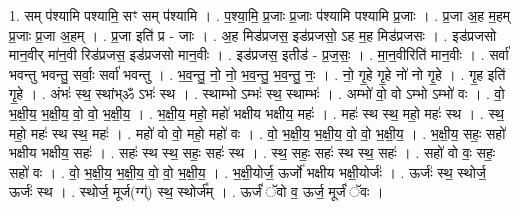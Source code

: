 \documentclass[17pt]{extarticle}
\begin{document}
1. सम् प॑श्यामि पश्यामि॒ सꣳ सम् प॑श्यामि । . प॒श्या॒मि॒ प्र॒जाः प्र॒जाः प॑श्यामि पश्यामि प्र॒जाः । . प्र॒जा अ॒ह म॒हम् प्र॒जाः प्र॒जा अ॒हम् । . प्र॒जा इति॑ प्र - जाः । . अ॒ह मिड॑प्रजस॒ इड॑प्रजसो॒ ऽह म॒ह मिड॑प्रजसः । . इड॑प्रजसो मान॒वीर् मा॑न॒वी रिड॑प्रजस॒ इड॑प्रजसो मान॒वीः । . इड॑प्रजस॒ इतीड॑ - प्र॒ज॒सः॒ । . मा॒न॒वीरिति॑ मान॒वीः । . सर्वा॑ भवन्तु भवन्तु॒ सर्वाः॒ सर्वा॑ भवन्तु । . भ॒व॒न्तु॒ नो॒ नो॒ भ॒व॒न्तु॒ भ॒व॒न्तु॒ नः॒ । . नो॒ गृ॒हे गृ॒हे नो॑ नो गृ॒हे । . गृ॒ह इति॑ गृ॒हे । . अंभः॑ स्थ॒ स्थांभ्ॐ ऽभः॑ स्थ । . स्थाम्भो ऽम्भः॑ स्थ॒ स्थाम्भः॑ । . अम्भो॑ वो॒ वो ऽम्भो ऽम्भो॑ वः । . वो॒ भ॒क्षी॒य॒ भ॒क्षी॒य॒ वो॒ वो॒ भ॒क्षी॒य॒ । . भ॒क्षी॒य॒ महो॒ महो॑ भक्षीय भक्षीय॒ महः॑ । . महः॑ स्थ स्थ॒ महो॒ महः॑ स्थ । . स्थ॒ महो॒ महः॑ स्थ स्थ॒ महः॑ । . महो॑ वो वो॒ महो॒ महो॑ वः । . वो॒ भ॒क्षी॒य॒ भ॒क्षी॒य॒ वो॒ वो॒ भ॒क्षी॒य॒ । . भ॒क्षी॒य॒ सहः॒ सहो॑ भक्षीय भक्षीय॒ सहः॑ । . सहः॑ स्थ स्थ॒ सहः॒ सहः॑ स्थ । . स्थ॒ सहः॒ सहः॑ स्थ स्थ॒ सहः॑ । . सहो॑ वो वः॒ सहः॒ सहो॑ वः । . वो॒ भ॒क्षी॒य॒ भ॒क्षी॒य॒ वो॒ वो॒ भ॒क्षी॒य॒ । . भ॒क्षी॒योर्ज॒ ऊर्जो॑ भक्षीय भक्षी॒योर्जः॑ । . ऊर्जः॑ स्थ॒ स्थोर्ज॒ ऊर्जः॑ स्थ । . स्थोर्ज॒ मूर्ज(ग्ग्॑) स्थ॒ स्थोर्ज᳚म् । . ऊर्जं॑ ॅवो व॒ ऊर्ज॒ मूर्जं॑ ॅवः । \newline
\end{document}
